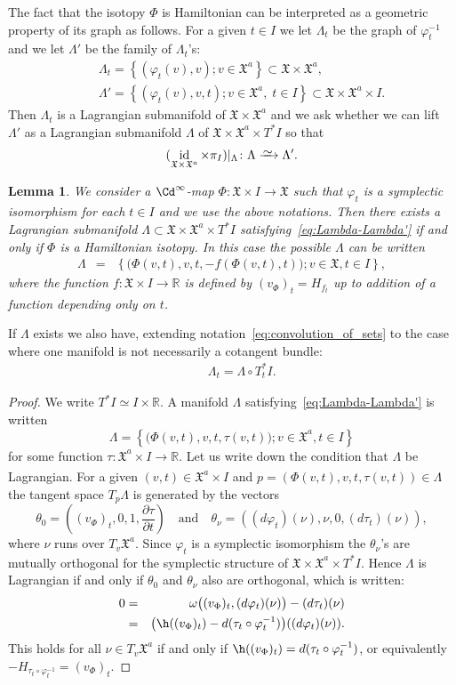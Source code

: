 \documentclass[12pt,leqno]{article}
\newtheorem{lemma}[theorem]{Lemma}
\theoremstyle{definition}
\newcommand{\R}{{\mathbb{R}}}
\def\phi{{\varphi}}
\newcommand{\symx}{{\mathfrak{X}}}
\renewcommand{\to}[1][]{\xrightarrow[]{#1}}
\newcommand{\isoto}[1][]{\xrightarrow[#1]%
{{\raisebox{-.6ex}[0ex][-.6ex]{$\mspace{1mu}\sim\mspace{2mu}$}}}}
\newcommand{\conv}[1][]{\mathop{\circ}\limits_{#1}}
\newcommand{\cl}{\colon}
\newcommand{\bl}{\bigl(}
\newcommand{\br}{\bigr)}
\newcommand{\eq}{\begin{eqnarray}}
\newcommand{\eneq}{\end{eqnarray}}
\newcommand{\eqn}{\begin{eqnarray*}}
\newcommand{\eneqn}{\end{eqnarray*}}
\newcommand{\set}[2]{\left\{#1 \mathbin{;} #2 \right\}}
\DeclareMathOperator{\id}{id}
\numberwithin{equation}{section}
\begin{document}
\medskip

The fact that the isotopy $\Phi$ is Hamiltonian can be interpreted as a
geometric property of its graph as follows.  For a given $t\in I$ we let
$\Lambda_{t}$ be the graph of $\phi_t^{-1}$
and we let $\Lambda'$ be the family of $\Lambda_t$'s:
\eqn
&&\Lambda_t=\set{(\phi_t(v),v)}{v\in\symx^a} \subset \symx\times\symx^a, \\
&& \Lambda'= \set{(\phi_t(v),v,t)}{v\in\symx^a, \; t\in I}
\subset  \symx \times \symx^a\times I.
\eneqn
Then $\Lambda_t$ is a Lagrangian submanifold of $\symx \times \symx^a$
and we ask whether
we can lift $\Lambda'$ as a Lagrangian submanifold $\Lambda$ of
$\symx \times \symx^a \times T^*I$ so that
\eq\label{eq:Lambda-Lambda'}
(\id_{\symx \times \symx^a} \times \pi_I)|_\Lambda \cl
\Lambda \isoto \Lambda'.
\eneq
\begin{lemma}\label{lem:Hamilt-isot}
We consider a $\Cd^\infty$-map $\Phi\cl \symx \times I\to \symx$ such that
$\phi_t$ is a symplectic isomorphism for each $t\in I$ and we use the above
notations.
Then there exists a Lagrangian submanifold
$\Lambda \subset \symx \times \symx^a \times T^*I$
satisfying~\eqref{eq:Lambda-Lambda'} if and only if $\Phi$ is a Hamiltonian
isotopy.
In this case the possible $\Lambda$ can be written
\eq
\label{eq:def-lambda}
\Lambda & = &
\set{\bl\Phi(v,t), v, t, -f(\Phi(v,t),t)\br}{ v\in\symx, t\in I},
\eneq
where the function $f\cl \symx \times I\to\R$ is defined 
by $(v_\Phi)_t = H_{f_t}$
up to addition of a function depending only on $t$.
\end{lemma}
If $\Lambda$ exists we also have, extending
notation~\eqref{eq:convolution_of_sets} to the case where one manifold is
not necessarily a cotangent bundle:
\eqn
&&\Lambda_{t} = \Lambda\conv T^*_{t}I.
\eneqn
\begin{proof}
We write $T^*I \simeq I\times\R$. A manifold $\Lambda$
satisfying~\eqref{eq:Lambda-Lambda'} is written
$$
\Lambda = \set{\bl\Phi(v,t), v, t, \tau(v,t)\br}{v\in\symx^a, t\in I}
$$
for some function $\tau\cl \symx^a \times I \to \R$.  Let us write down the
condition that $\Lambda$ be Lagrangian.  For a given
$(v,t) \in \symx^a \times I$ and $p= (\Phi(v,t), v, t, \tau(v,t)) \in \Lambda$
the tangent space $T_p\Lambda$ is generated by the vectors
$$
\theta_0 = ( (v_\Phi)_t, 0, 1,
\frac{\partial\tau}{\partial t} )
\quad \mbox{and} \quad
\theta_\nu = ( (d\phi_t)(\nu), \nu,0, (d\tau_t)(\nu) ),
$$
where $\nu$ runs over $T_v\symx^a$.  Since $\phi_t$ is a symplectic
isomorphism the $\theta_\nu$'s are mutually orthogonal for the symplectic
structure of $\symx \times \symx^a \times T^*I$. Hence $\Lambda$ is Lagrangian
if and only if $\theta_0$ and $\theta_\nu$ also are orthogonal, which is
written:
\eqn
0 &=&
\omega\bl (v_\Phi)_t , (d\phi_t)(\nu)\br - (d\tau_t)(\nu) \\
&=&
\bl \h((v_\Phi)_t) - d(\tau_t\circ\phi_t^{-1})\br ((d\phi_t)(\nu)).
\eneqn
This holds for all $\nu \in T_v\symx^a$ if and only if
$\h((v_\Phi)_t)=d(\tau_t\circ\phi_t^{-1})$, or equivalently
$-H_{\tau_t\circ\phi_t^{-1}}=(v_\Phi)_t$.
\end{proof}
\end{document}

